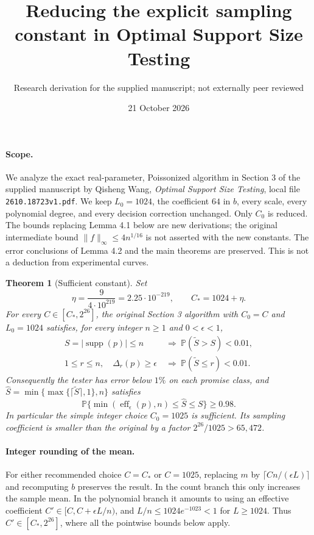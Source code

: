 \documentclass[11pt]{article}
\title{Reducing the explicit sampling constant in Optimal Support Size Testing}
\author{Research derivation for the supplied manuscript; not externally peer reviewed}
\date{21 October 2026}
\newtheorem{theorem}{Theorem}
\newcommand{\Prb}{\mathbb P}
\newcommand{\supp}{\operatorname{supp}}
\begin{document}
\maketitle

\paragraph{Scope.}
We analyze the exact real-parameter, Poissonized algorithm in Section 3 of the
supplied manuscript by Qisheng Wang, \emph{Optimal Support Size Testing},
local file \texttt{2610.18723v1.pdf}. We keep $L_0=1024$, the coefficient $64$
in $b$, every scale, every polynomial degree, and every decision correction
unchanged. Only $C_0$ is reduced. The bounds replacing Lemma 4.1 below are new
derivations; the original intermediate bound $\|f\|_\infty\le4n^{1/16}$ is not
asserted with the new constants. The error conclusions of Lemma 4.2 and the
main theorems are preserved. This is not a deduction from experimental curves.

\begin{theorem}[Sufficient constant]
Set
\[
 \eta=\frac{9}{4\cdot10^{219}}=2.25\cdot10^{-219},\qquad
 C_* =1024+\eta.
\]
For every $C\in[C_*,2^{26}]$, the original Section 3 algorithm with $C_0=C$
and $L_0=1024$ satisfies, for every integer $n\ge1$ and $0<\epsilon<1$,
\begin{align}
 S=|\supp(p)|\le n&\ \Longrightarrow\
 \Prb(\widetilde S>S)<0.01,\label{eq:upper}\\
 1\le r\le n,\quad\Delta_r(p)\ge\epsilon&\ \Longrightarrow\
 \Prb(\widetilde S\le r)<0.01.\label{eq:lower}
\end{align}
Consequently the tester has error below $1\%$ on each promise class, and
$\widehat S=\min\{\max\{\lceil\widetilde S\rceil,1\},n\}$ satisfies
\[
 \Prb\{\min(\operatorname{eff}_\epsilon(p),n)\le\widehat S\le S\}\ge0.98.
\]
In particular the simple integer choice $C_0=1025$ is sufficient. Its
sampling coefficient is smaller than the original by a factor
$2^{26}/1025>65{,}472$.
\end{theorem}

\paragraph{Integer rounding of the mean.}
For either recommended choice $C=C_*$ or $C=1025$, replacing $m$ by
$\lceil Cn/(\epsilon L)\rceil$ and recomputing $b$ preserves the result.
In the count branch this only increases the sample mean. In the polynomial
branch it amounts to using an effective coefficient
$C'\in[C,C+\epsilon L/n)$, and $L/n\le1024e^{-1023}<1$ for $L\ge1024$.
Thus $C'\in[C_*,2^{26}]$, where all the pointwise bounds below apply.
\end{document}
